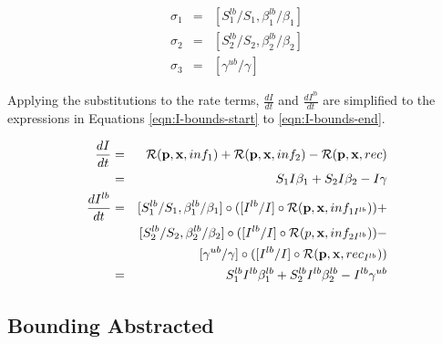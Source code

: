\begin{eqnarray}\label{eqn:I-subs-start}
     \sigma_{1} &=& [S_1^{lb}/S_1,  \beta_1^{lb}/\beta_1]\\
    \sigma_{2} &=& [S_2^{lb}/S_2, \beta_2^{lb}/\beta_2]\\
    \sigma_{3} &=& [ \gamma^{ub}/\gamma]\label{eqn:I-subs-end}
\end{eqnarray}

Applying the substitutions to the rate terms,  $\frac{dI}{dt}$ and $\frac{dI^{lb}}{dt}$ are simplified to the expressions in Equations \ref{eqn:I-bounds-start} to \ref{eqn:I-bounds-end}.

\begin{eqnarray}\label{eqn:I-bounds-start}
    \frac{dI}{dt} &=& {\cal R}({\bf p}, {\bf x}, inf_1) + {\cal R}({\bf p}, {\bf x}, inf_2) -  {\cal R}({\bf p}, {\bf x}, rec)\\
    &=& S_1I\beta_1 + S_2I\beta_2 - I\gamma\\
    \frac{dI^{lb}}{dt} &=& [S_1^{lb}/S_1,  \beta_1^{lb}/\beta_1] \circ ([I^{lb}/I] \circ {\cal R}({\bf p}, {\bf x}, inf_{1 I^{lb}})) + \\
    && [S_2^{lb}/S_2, \beta_2^{lb}/\beta_2] \circ ([I^{lb}/I] \circ {\cal R}({ p}, {\bf x}, inf_{2 I^{lb}})) -  \\
    && [ \gamma^{ub}/\gamma] \circ ([I^{lb}/I] \circ {\cal R}({\bf p}, {\bf x}, rec_{I^{lb}}))\\
    &=&S_1^{lb}I^{lb}\beta_1^{lb} + S_2^{lb}I^{lb}\beta_2^{lb} - I^{lb}\gamma^{ub} \label{eqn:I-bounds-end}
\end{eqnarray}

\subsection{Bounding Abstracted \Petrinets{}}

